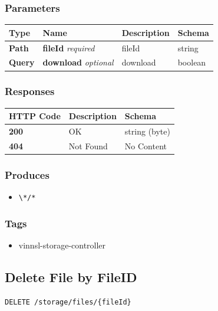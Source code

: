 \subsubsection{Parameters}\label{parameters-14}

\begin{longtable}[]{@{}llll@{}}
\toprule
Type & Name & Description & Schema\tabularnewline
\midrule
\endhead
\textbf{Path} & \textbf{fileId} \emph{required} & fileId &
string\tabularnewline
\textbf{Query} & \textbf{download} \emph{optional} & download &
boolean\tabularnewline
\bottomrule
\end{longtable}

\subsubsection{Responses}\label{responses-18}

\begin{longtable}[]{@{}lll@{}}
\toprule
HTTP Code & Description & Schema\tabularnewline
\midrule
\endhead
\textbf{200} & OK & string (byte)\tabularnewline
\textbf{404} & Not Found & No Content\tabularnewline
\bottomrule
\end{longtable}

\subsubsection{Produces}\label{produces-18}

\begin{itemize}
\tightlist
\item
  \texttt{\textbackslash{}*/*}
\end{itemize}

\subsubsection{Tags}\label{tags-18}

\begin{itemize}
\tightlist
\item
  vinnsl-storage-controller
\end{itemize}

\subsection{Delete File by FileID}\label{delete-file-by-fileid}

\begin{verbatim}
DELETE /storage/files/{fileId}
\end{verbatim}

